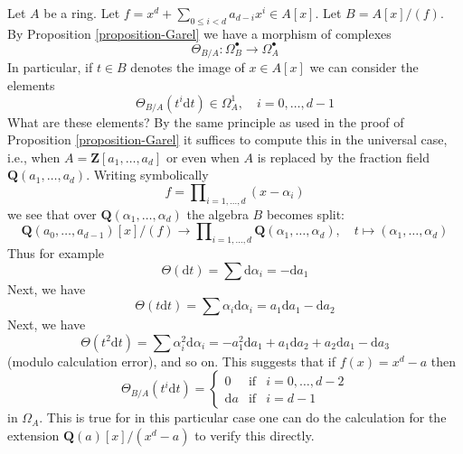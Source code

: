 \begin{example}
\label{example-Garel}
Let $A$ be a ring. Let $f = x^d + \sum_{0 \leq i < d} a_{d - i} x^i \in A[x]$.
Let $B = A[x]/(f)$. By Proposition \ref{proposition-Garel}
we have a morphism of complexes
$$
\Theta_{B/A} : \Omega^\bullet_B \longrightarrow \Omega^\bullet_A
$$
In particular, if $t \in B$ denotes the image of $x \in A[x]$
we can consider the elements
$$
\Theta_{B/A}(t^i\text{d}t) \in \Omega^1_A,\quad i = 0, \ldots, d - 1
$$
What are these elements? By the same principle as used in the proof of
Proposition \ref{proposition-Garel} it suffices to compute this
in the universal case, i.e., when $A = \mathbf{Z}[a_1, \ldots, a_d]$
or even when $A$ is replaced by the fraction field
$\mathbf{Q}(a_1, \ldots, a_d)$. Writing symbolically
$$
f = \prod\nolimits_{i = 1, \ldots, d} (x - \alpha_i)
$$
we see that over $\mathbf{Q}(\alpha_1, \ldots, \alpha_d)$
the algebra $B$ becomes split:
$$
\mathbf{Q}(a_0, \ldots, a_{d - 1})[x]/(f) 
\longrightarrow
\prod\nolimits_{i = 1, \ldots, d} \mathbf{Q}(\alpha_1, \ldots, \alpha_d),
\quad
t \longmapsto (\alpha_1, \ldots, \alpha_d)
$$
Thus for example
$$
\Theta(\text{d}t) = \sum \text{d} \alpha_i = - \text{d}a_1
$$
Next, we have
$$
\Theta(t\text{d}t) = \sum \alpha_i \text{d}\alpha_i =
a_1 \text{d} a_1 - \text{d}a_2
$$
Next, we have
$$
\Theta(t^2\text{d}t) = \sum \alpha_i^2 \text{d}\alpha_i =
- a_1^2 \text{d} a_1 + a_1 \text{d}a_2 + a_2 \text{d}a_1 - \text{d}a_3
$$
(modulo calculation error), and so on. This suggests that
if $f(x) = x^d - a$ then
$$
\Theta_{B/A}(t^i\text{d}t) =
\left\{
\begin{matrix}
0 & \text{if} & i = 0, \ldots, d - 2 \\
\text{d}a & \text{if} & i = d - 1
\end{matrix}
\right.
$$
in $\Omega_A$. This is true for in this particular case one can do
the calculation for the extension $\mathbf{Q}(a)[x]/(x^d - a)$
to verify this directly.
\end{example}

















